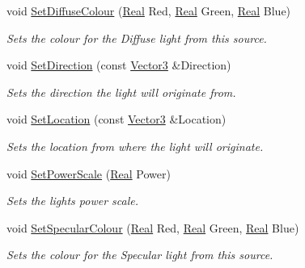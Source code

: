 \begin{DoxyCompactItemize}
void \hyperlink{classphys_1_1Light_aa54aed6085b348631daa26bc820bb715}{SetDiffuseColour} (\hyperlink{namespacephys_af7eb897198d265b8e868f45240230d5f}{Real} Red, \hyperlink{namespacephys_af7eb897198d265b8e868f45240230d5f}{Real} Green, \hyperlink{namespacephys_af7eb897198d265b8e868f45240230d5f}{Real} Blue)
\begin{DoxyCompactList}\small\item\em Sets the colour for the Diffuse light from this source. \item\end{DoxyCompactList}\item 
void \hyperlink{classphys_1_1Light_a400a73e51a5aa50aadc43bdd2040ac71}{SetDirection} (const \hyperlink{classphys_1_1Vector3}{Vector3} \&Direction)
\begin{DoxyCompactList}\small\item\em Sets the direction the light will originate from. \item\end{DoxyCompactList}\item 
void \hyperlink{classphys_1_1Light_adf0d72c9ad1b0cff94bd7f4cba987750}{SetLocation} (const \hyperlink{classphys_1_1Vector3}{Vector3} \&Location)
\begin{DoxyCompactList}\small\item\em Sets the location from where the light will originate. \item\end{DoxyCompactList}\item 
void \hyperlink{classphys_1_1Light_af4a6428b87c443a33261575783a4fb05}{SetPowerScale} (\hyperlink{namespacephys_af7eb897198d265b8e868f45240230d5f}{Real} Power)
\begin{DoxyCompactList}\small\item\em Sets the lights power scale. \item\end{DoxyCompactList}\item 
void \hyperlink{classphys_1_1Light_a6f2f7b5745e455e7281f7c5e76766c1b}{SetSpecularColour} (\hyperlink{namespacephys_af7eb897198d265b8e868f45240230d5f}{Real} Red, \hyperlink{namespacephys_af7eb897198d265b8e868f45240230d5f}{Real} Green, \hyperlink{namespacephys_af7eb897198d265b8e868f45240230d5f}{Real} Blue)
\begin{DoxyCompactList}\small\item\em Sets the colour for the Specular light from this source. \item\end{DoxyCompactList}\item 

\end{DoxyCompactItemize}
